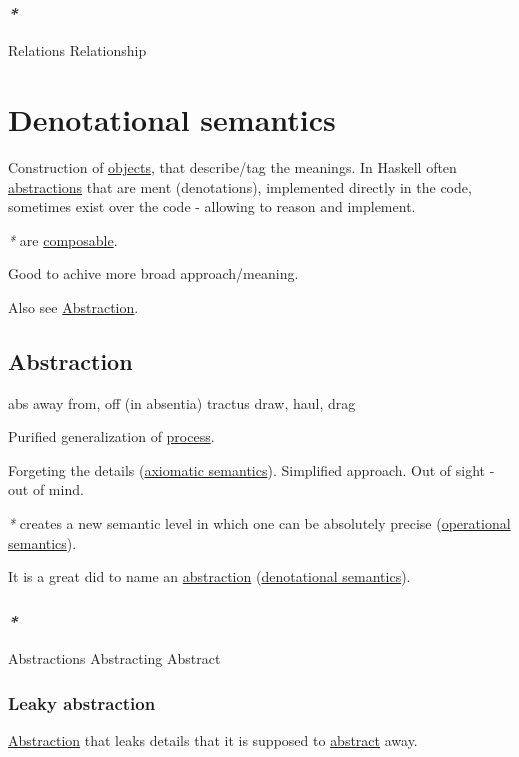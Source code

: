 \documentclass[a4paper,14pt,oneside]{book}
\begin{document}
\subsubsection{\emph{*}}
\label{sec:orgcc75d9c}

\label{org576d28c}Relations
\label{org8fea1c1}Relationship

\section{\label{org56099b9}Denotational semantics}
\label{sec:org72287a4}
Construction of \hyperref[org88e24d2]{objects}, that describe/tag the meanings. In Haskell often \hyperref[org394d42e]{abstractions} that are ment (denotations), implemented directly in the code, sometimes exist over the code - allowing to reason and implement.

\emph{*} are \hyperref[org3377dca]{composable}.

Good to achive more broad approach/meaning.

Also see \hyperref[org550217a]{Abstraction}.

\subsection{\label{org550217a}Abstraction}
\label{sec:org04ec1cf}
abs away from, off (in absentia)
tractus draw, haul, drag

Purified generalization of \hyperref[org8b072db]{process}.

Forgeting the details (\hyperref[org66716d3]{axiomatic semantics}). Simplified approach. Out of sight - out of mind.

\emph{*} creates a new semantic level in which one can be absolutely precise (\hyperref[org5440187]{operational semantics}).

It is a great did to name an \hyperref[org550217a]{abstraction} (\hyperref[org56099b9]{denotational semantics}).

\subsubsection{\emph{*}}
\label{sec:org7a1763f}

\label{org394d42e}Abstractions
\label{orga2a9d1f}Abstracting
\label{org6ee4249}Abstract

\subsubsection{\label{org1849b51}Leaky abstraction}
\label{sec:org0b77b32}
\hyperref[org550217a]{Abstraction} that leaks details that it is supposed to \hyperref[org6ee4249]{abstract} away.
\end{document}
